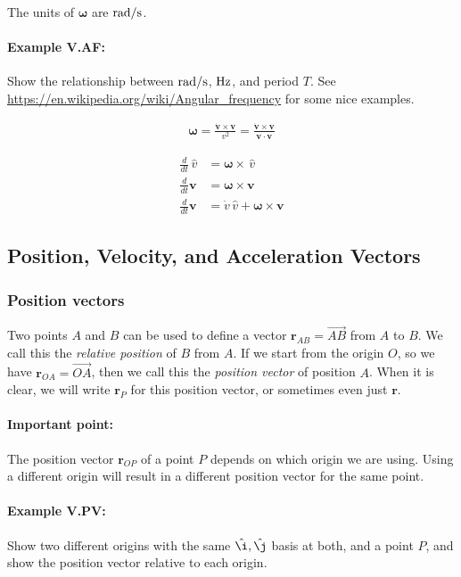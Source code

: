 \documentclass{article}
\renewcommand{\vec}[1]{\boldsymbol{#1}}
\newcommand{\unit}[1]{\,\hat{#1}}
\begin{document}
The units of $\vec{\omega}$ are $\rm rad/s$.

\paragraph{Example V.AF:} Show the relationship between $\rm rad/s$, $\rm
Hz$, and period $T$. See
\url{https://en.wikipedia.org/wiki/Angular_frequency} for some nice
examples.

\begin{align}
  \vec{\omega} = \frac{\dot{\vec{v}} \times \vec{v}}{v^2}
  = \frac{\dot{\vec{v}} \times \vec{v}}{\vec{v} \cdot \vec{v}}
\end{align}

\begin{align}
  \frac{d}{dt} \unit{v} &= \vec{\omega} \times \unit{v} \\
  \frac{d}{dt} \vec{v} &= \vec{\omega} \times \vec{v} \\
  \frac{d}{dt} \vec{v} &= \dot{v} \unit{v} + \vec{\omega} \times \vec{v}
\end{align}

\subsection{Position, Velocity, and Acceleration Vectors}

\subsubsection{Position vectors}

Two points $A$ and $B$ can be used to define a vector $\vec{r}_{AB} =
\overrightarrow{AB}$ from $A$ to $B$. We call this the \emph{relative
  position} of $B$ from $A$. If we start from the origin $O$, so we
have $\vec{r}_{OA} = \overrightarrow{OA}$, then we call this the
\emph{position vector} of position $A$. When it is clear, we will
write $\vec{r}_P$ for this position vector, or sometimes even just
$\vec{r}$.

\paragraph{Important point:} The position vector $\vec{r}_{OP}$ of a
point $P$ depends on which origin we are using. Using a different
origin will result in a different position vector for the same point.

\paragraph{Example V.PV:} Show two different origins with the same
$\hat\i,\hat\j$ basis at both, and a point $P$, and show the position
vector relative to each origin.
\end{document}
